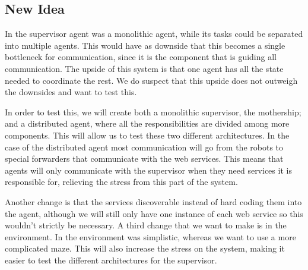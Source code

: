 \subsection{New Idea} 

In \cite{intframe} the supervisor agent was a monolithic agent, while its
tasks could be separated into multiple agents. This would have as downside
that this becomes a single bottleneck for communication, since it is the
component that is guiding all communication. The upside of this system is
that one agent has all the state needed to coordinate the rest. We do
suspect that this upside does not outweigh the downsides and want to test
this.

In order to test this, we will create both a monolithic supervisor, the
mothership; and a distributed agent, where all the responsibilities are
divided among more components. This will allow us to test these two
different architectures. In the case of the distributed agent most
communication will go from the robots to special forwarders that
communicate with the web services. This means that agents will only communicate
with the supervisor when they need services it is responsible for, relieving
the stress from this part of the system.

Another change is that the services discoverable instead of hard coding them
into the agent, although we will still only have one instance of each web
service so this wouldn't strictly be necessary. A third change that we want to
make is in the environment. In \cite{intframe} the environment was simplistic,
whereas we want to use a more complicated maze. This will also increase the
stress on the system, making it easier to test the different architectures
for the supervisor. 

% 
